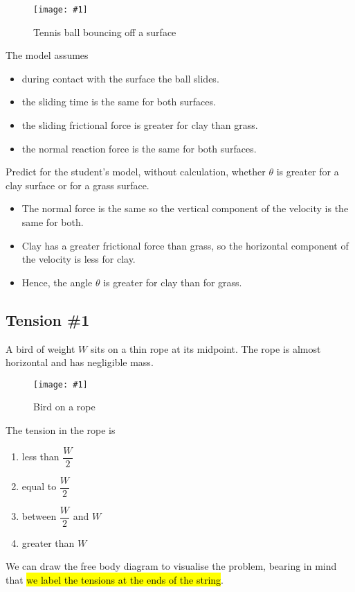 \documentclass[a4paper,12pt]{article}
\newcommand{\img}[4]{\begin{center}
  \begin{figure}[H]
    \centering
    \texttt{[image: \#1]}
    \caption{#3}
    \label{fig:#4}
  \end{figure}
\end{center}}
\begin{document}
\begin{enumerate}[label=(\alph*)]
        \img{ex/5.png}{0.9}{Tennis ball bouncing off a surface}{tennisballbounce}
        The model assumes
        \begin{itemize}
          \item during contact with the surface the ball slides.
          \item the sliding time is the same for both surfaces.
          \item the sliding frictional force is greater for clay than grass.
          \item the normal reaction force is the same for both surfaces.
        \end{itemize}
        Predict for the student's model, without calculation, whether $\theta$ is greater for a clay surface or for a grass surface.
        \begin{itemize}
          \item The normal force is the same so the vertical component of the velocity is the same for both.
          \item Clay has a greater frictional force than grass, so the horizontal component of the velocity is less for clay.
          \item Hence, the angle $\theta$ is greater for clay than for grass.
        \end{itemize}
\end{enumerate}


\subsection{Tension \#1}

A bird of weight $W$ sits on a thin rope at its midpoint. The rope is almost horizontal and has negligible mass.

\img{ex/6.png}{0.5}{Bird on a rope}{birdrope}

The tension in the rope is
\begin{enumerate}[label=\Alph*.]
  \item less than $\dfrac{W}{2}$
  \item equal to $\dfrac{W}{2}$
  \item between $\dfrac{W}{2}$ and $W$
  \item greater than $W$
\end{enumerate}

We can draw the free body diagram to visualise the problem, bearing in mind that \hl{we label the tensions at the ends of the string}.
\end{document}
